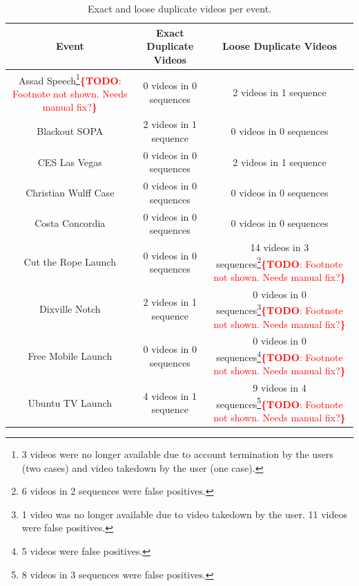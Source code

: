 \documentclass{acm_proc_article-sp}
\newcommand{\todo}[1]{\noindent\textcolor{red}{{\bf \{TODO}: #1{\bf \}}}}
\begin{document}
\begin{table}[htbp]
  \begin{tabular}{ | c | c | c | }
    \hline
    \textbf{Event} & \textbf{Exact Duplicate Videos} & \textbf{Loose Duplicate Videos}\\
    \hline
    Assad Speech\footnote{3 videos were no longer available due to account termination by the users (two cases) and video takedown by the user (one case).}\todo{Footnote not shown. Needs manual fix?} & 0 videos in 0 sequences & 2 videos in 1 sequence\\
    Blackout SOPA & 2 videos in 1 sequence & 0 videos in 0 sequences\\
    CES Las Vegas & 0 videos in 0 sequences & 2 videos in 1 sequence\\
    Christian Wulff Case & 0 videos in 0 sequences & 0 videos in 0 sequences\\
    Costa Concordia & 0 videos in 0 sequences & 0 videos in 0 sequences\\
    Cut the Rope Launch & 0 videos in 0 sequences & 14 videos in 3 sequences\footnote{6 videos in 2 sequences were false positives.}\todo{Footnote not shown. Needs manual fix?}\\
    Dixville Notch & 2 videos in 1 sequence & 0 videos in 0 sequences\footnote{1 video was no longer available due to video takedown by the user. 11 videos were false positives.}\todo{Footnote not shown. Needs manual fix?}\\
    Free Mobile Launch & 0 videos in 0 sequences & 0 videos in 0 sequences\footnote{5 videos were false positives.}\todo{Footnote not shown. Needs manual fix?}\\
    Ubuntu TV Launch & 4 videos in 1 sequence & 9 videos in 4 sequences\footnote{8 videos in 3 sequences were false positives.}\todo{Footnote not shown. Needs manual fix?}\\
    \hline
  \end{tabular}
  \label{tab:duplicatevideos}
  \caption{Exact and loose duplicate videos per event.}
\end{table}

\clearpage
\end{document}
